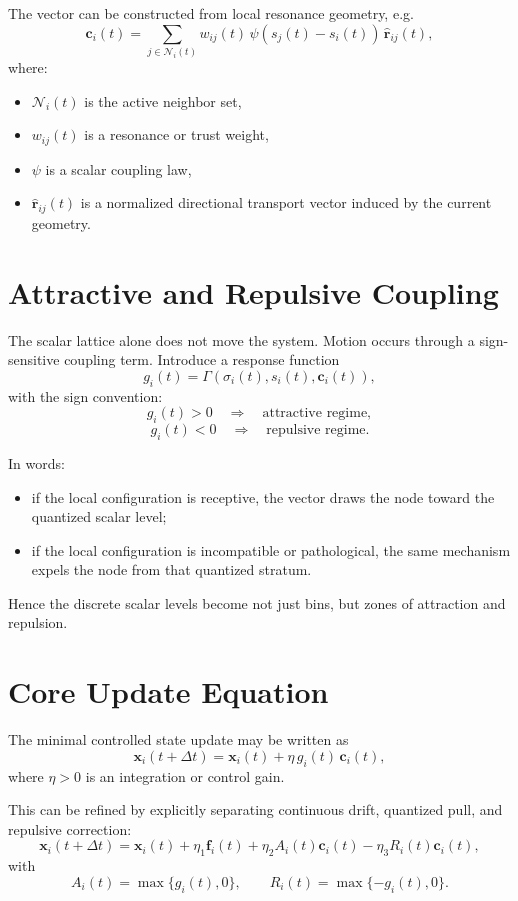 \documentclass[11pt,a4paper]{article}
\begin{document}
The vector can be constructed from local resonance geometry, e.g.
\[
\mathbf{c}_i(t)
=
\sum_{j \in \mathcal{N}_i(t)}
w_{ij}(t)\,
\psi\!\left(s_j(t) - s_i(t)\right)\,
\widehat{\mathbf{r}}_{ij}(t),
\]
where:
\begin{itemize}
    \item $\mathcal{N}_i(t)$ is the active neighbor set,
    \item $w_{ij}(t)$ is a resonance or trust weight,
    \item $\psi$ is a scalar coupling law,
    \item $\widehat{\mathbf{r}}_{ij}(t)$ is a normalized directional transport
    vector induced by the current geometry.
\end{itemize}

\section{Attractive and Repulsive Coupling}
The scalar lattice alone does not move the system. Motion occurs through a
sign-sensitive coupling term. Introduce a response function
\[
g_i(t) = \Gamma\!\left(\sigma_i(t), s_i(t), \mathbf{c}_i(t)\right),
\]
with the sign convention:
\[
g_i(t) > 0 \quad \Rightarrow \quad \text{attractive regime},
\]
\[
g_i(t) < 0 \quad \Rightarrow \quad \text{repulsive regime}.
\]

In words:
\begin{itemize}
    \item if the local configuration is receptive, the vector draws the node
    toward the quantized scalar level;
    \item if the local configuration is incompatible or pathological, the same
    mechanism expels the node from that quantized stratum.
\end{itemize}

Hence the discrete scalar levels become not just bins, but zones of attraction
and repulsion.

\section{Core Update Equation}
The minimal controlled state update may be written as
\[
\mathbf{x}_i(t+\Delta t)
=
\mathbf{x}_i(t)
+
\eta\,
g_i(t)\,
\mathbf{c}_i(t),
\]
where $\eta > 0$ is an integration or control gain.

This can be refined by explicitly separating continuous drift, quantized pull,
and repulsive correction:
\[
\mathbf{x}_i(t+\Delta t)
=
\mathbf{x}_i(t)
+
\eta_1 \mathbf{f}_i(t)
+
\eta_2 A_i(t)\mathbf{c}_i(t)
-
\eta_3 R_i(t)\mathbf{c}_i(t),
\]
with
\[
A_i(t) = \max\{g_i(t),0\},
\qquad
R_i(t) = \max\{-g_i(t),0\}.
\]
\end{document}
